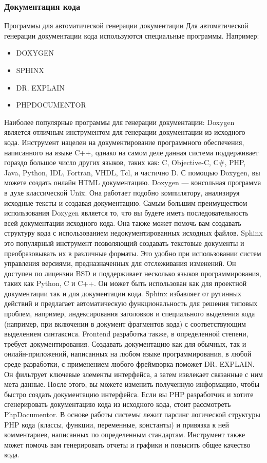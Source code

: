 \documentclass{../industrial-development}
\begin{document}
\begin{frame} \frametitle{Документация кода}
  \begin{block}{Программы для автоматической генерации документации}
 Для автоматической генерации документации кода используются специальные программы. Например:
  \end{block}
  \begin{itemize}
  \item DOXYGEN
  \item SPHINX
  \item DR. EXPLAIN
  \item PHPDOCUMENTOR
  \end{itemize}
\end{frame}
\lecturenotes
Наиболее популярные программы для генерации документации:
Doxygen является отличным инструментом для генерации документации из исходного кода. Инструмент нацелен на документирование программного обеспечения, написанного на языке C++, однако на самом деле данная система поддерживает гораздо большое число других языков, таких как: C, Objective-C, C#, PHP, Java, Python, IDL, Fortran, VHDL, Tcl, и частично D. С помощью Doxygen, вы можете создать онлайн HTML документацию. Doxygen — консольная программа в духе классической Unix. Она работает подобно компилятору, анализируя исходные тексты и создавая документацию. Самым большим преимуществом использования Doxygen является то, что вы будете иметь последовательность всей документации исходного кода. Она также может помочь вам создавать структуру кода с использованием недокументированных исходных файлов.
Sphinx это популярный инструмент позволяющий создавать текстовые документы и преобразовывать их в различные форматы. Это удобно при использовании систем управления версиями, предназначенных для отслеживания изменений. Он доступен по лицензии BSD и поддерживает несколько языков программирования, таких как Python, C и C++. Он может быть использован как для проектной документации так и для документации кода. Sphinx избавляет от рутинных действий и предлагает автоматическую функциональность для решения типовых проблем, например, индексирования заголовков и специального выделения кода (например, при включении в документ фрагментов кода) с соответствующим выделением синтаксиса.
Frontend разработка также, в определенной степени, требует документирования. Создавать документацию как для обычных, так и онлайн-приложений, написанных на любом языке программирования, в любой среде разработки, с применением любого фреймворка поможет DR. EXPLAIN. Он фильтрует ключевые элементы интерфейса, а затем извлекает связанные с ним мета данные. После этого, вы можете изменить полученную информацию, чтобы быстро создать документацию интерфейса.  
Если вы PHP разработчик и хотите сгенерировать документацию кода из исходного кода, стоит рассмотреть PhpDocumentor. В основе работы системы лежит парсинг логической структуры PHP кода (классы, функции, переменные, константы) и привязка к ней комментариев, написанных по определенным стандартам. Инструмент также может помочь вам генерировать отчеты и графики и повысить общее качество кода.

\begin{thebibliography}{99}
\end{thebibliography}
\end{document}
